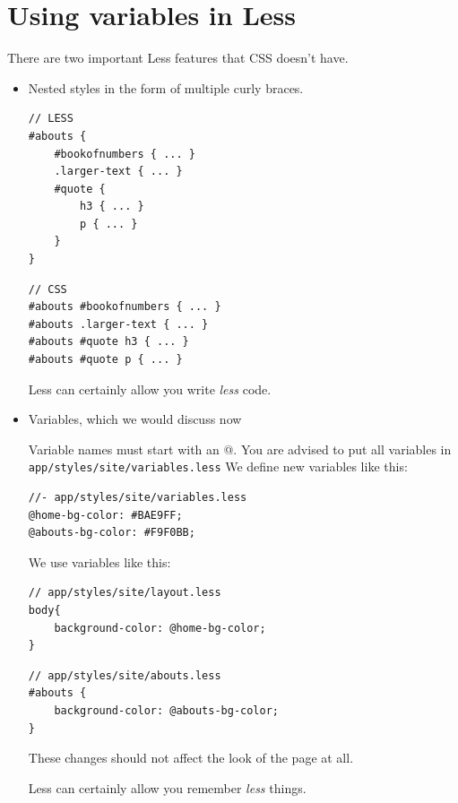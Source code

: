 \section{Using variables in Less}
\label{sec:lessvariables}
There are two important Less features that CSS doesn't have.
\begin{itemize}
\item Nested styles in the form of multiple curly braces.

\begin{lstlisting}[language=pug]
// LESS
#abouts {
    #bookofnumbers { ... }
    .larger-text { ... }
    #quote {
        h3 { ... }
        p { ... }
    }
}
\end{lstlisting}

\begin{lstlisting}[language=pug]
// CSS 
#abouts #bookofnumbers { ... }
#abouts .larger-text { ... }
#abouts #quote h3 { ... }
#abouts #quote p { ... }
\end{lstlisting}

Less can certainly allow you write \textit{less} code.

\item Variables, which we would discuss now

Variable names must start with an @. You are advised to put all variables in \texttt{app/styles/site/variables.less} We define new variables like this:

\begin{lstlisting}[language=pug]
//- app/styles/site/variables.less
@home-bg-color: #BAE9FF;
@abouts-bg-color: #F9F0BB;
\end{lstlisting}

We use variables like this:

\begin{lstlisting}[language=pug]
// app/styles/site/layout.less
body{
    background-color: @home-bg-color;
}
\end{lstlisting}

\begin{lstlisting}[language=pug]
// app/styles/site/abouts.less
#abouts {
    background-color: @abouts-bg-color;
}
\end{lstlisting}

These changes should not affect the look of the page at all. 

Less can certainly allow you remember \textit{less} things.

\end{itemize}

